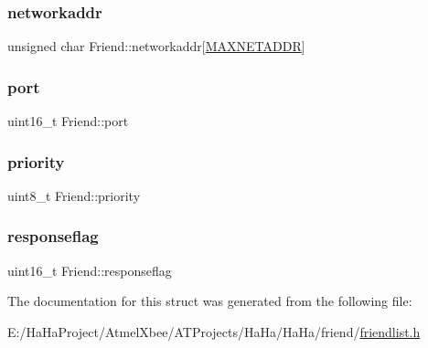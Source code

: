 \subsubsection{\texorpdfstring{networkaddr}{networkaddr}}
{\footnotesize\ttfamily unsigned char Friend\+::networkaddr\mbox{[}\hyperlink{packet_8h_a64e48eb75238bd3d7a053f19071044a8}{M\+A\+X\+N\+E\+T\+A\+D\+DR}\mbox{]}}

\mbox{\label{struct_friend_a783801da9846ad8d6b8f12ff16ac68fb}} 
\subsubsection{\texorpdfstring{port}{port}}
{\footnotesize\ttfamily uint16\+\_\+t Friend\+::port}

\mbox{\label{struct_friend_a43c33ac49be70c487897c484beb45d65}} 
\subsubsection{\texorpdfstring{priority}{priority}}
{\footnotesize\ttfamily uint8\+\_\+t Friend\+::priority}

\mbox{\label{struct_friend_ac42fed371a42091f4b5abce0d3827e3b}} 
\subsubsection{\texorpdfstring{responseflag}{responseflag}}
{\footnotesize\ttfamily uint16\+\_\+t Friend\+::responseflag}



The documentation for this struct was generated from the following file\+:\begin{DoxyCompactItemize}
\item 
E\+:/\+Ha\+Ha\+Project/\+Atmel\+Xbee/\+A\+T\+Projects/\+Ha\+Ha/\+Ha\+Ha/friend/\hyperlink{friendlist_8h}{friendlist.\+h}\end{DoxyCompactItemize}
